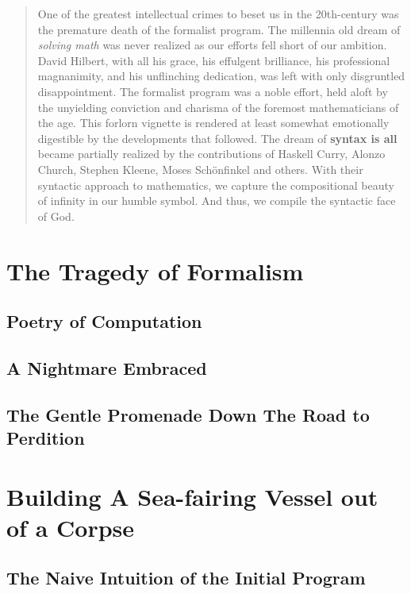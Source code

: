\maketitle
\pagebreak

\begin{abstract}
    One of the greatest intellectual crimes to beset us in the 20th-century was
    the premature death of the formalist program. The millennia old dream of
    \textit{solving math} was never realized as our efforts fell short of our
    ambition. David Hilbert, with all his grace, his effulgent brilliance, his
    professional magnanimity, and his unflinching dedication, was left with only
    disgruntled disappointment. The formalist program was a noble effort, held
    aloft by the unyielding conviction and charisma of the foremost
    mathematicians of the age. This forlorn vignette is rendered at least
    somewhat emotionally digestible by the developments that followed. The dream
    of \textbf{syntax is all} became partially realized by the contributions of Haskell
    Curry, Alonzo Church, Stephen Kleene, Moses Schönfinkel and others. With
    their syntactic approach to mathematics, we capture the compositional beauty
    of infinity in our humble symbol. And thus, we compile the syntactic face of God.
\end{abstract}
\pagebreak
\tableofcontents
\pagebreak

\section{The Tragedy of Formalism}
\subsection{Poetry of Computation}
\subsection{A Nightmare Embraced}
\subsection{The Gentle Promenade Down The Road to Perdition}

\section{Building A Sea-fairing Vessel out of a Corpse}
\subsection{The Naive Intuition of the Initial Program}
